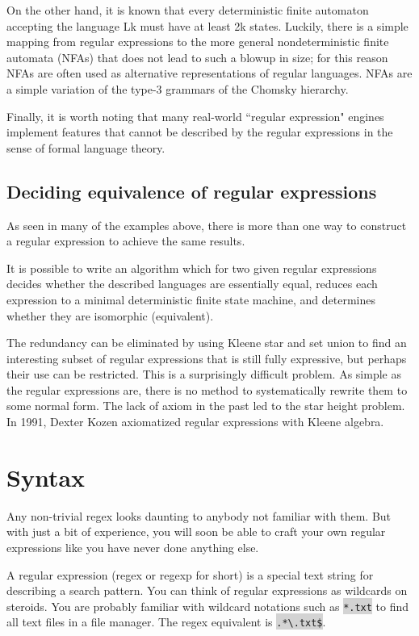 On the other hand, it is known that every deterministic finite automaton accepting the language Lk must have at least 2k states. Luckily, there is a simple mapping from regular expressions to the more general nondeterministic finite automata (NFAs) that does not lead to such a blowup in size; for this reason NFAs are often used as alternative representations of regular languages. NFAs are a simple variation of the type-3 grammars of the Chomsky hierarchy.

Finally, it is worth noting that many real-world ``regular expression" engines implement features that cannot be described by the regular expressions in the sense of formal language theory.




\section{Deciding equivalence of regular expressions}

As seen in many of the examples above, there is more than one way to construct a regular expression to achieve the same results.

It is possible to write an algorithm which for two given regular expressions decides whether the described languages are essentially equal, reduces each expression to a minimal deterministic finite state machine, and determines whether they are isomorphic (equivalent).

The redundancy can be eliminated by using Kleene star and set union to find an interesting subset of regular expressions that is still fully expressive, but perhaps their use can be restricted. This is a surprisingly difficult problem. As simple as the regular expressions are, there is no method to systematically rewrite them to some normal form. The lack of axiom in the past led to the star height problem. In 1991, Dexter Kozen axiomatized regular expressions with Kleene algebra.



\chapter{Syntax}
\label{regular_expression_syntax}

Any non-trivial regex looks daunting to anybody not familiar with them. But with just a bit of experience, you will soon be able to craft your own regular expressions like you have never done anything else. 

A regular expression (regex or regexp for short) is a special text string for describing a search pattern. You can think of regular expressions as wildcards on steroids. You are probably familiar with wildcard notations such as \colorbox{lightgray}{\texttt{*.txt}} to find all text files in a file manager. The regex equivalent is \colorbox{lightgray}{\texttt{.*\textbackslash .txt\$}}.\cite{regexp_wildcard}

